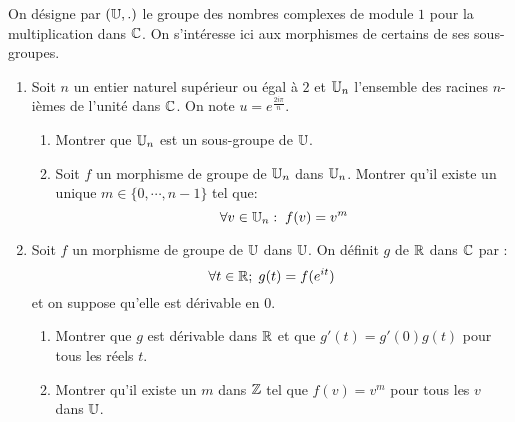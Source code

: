 On désigne par $(\mathbb{U},.)$ le groupe des nombres complexes de module $1$ pour la multiplication dans $\mathbb{C}$. On s'intéresse ici aux morphismes de certains de ses sous-groupes.
\begin{enumerate}
 \item Soit $n$ un entier naturel supérieur ou égal à $2$ et $\mathbb{U}_n$ l'ensemble des racines $n$-ièmes de l'unité dans $\mathbb{C}$. On note $u=e^{\frac{2i\pi}{n}}$.
 \begin{enumerate}
  \item Montrer que $\mathbb{U}_n$ est un sous-groupe de $\mathbb{U}$.
  \item Soit $f$ un morphisme de groupe de $\mathbb{U}_n$ dans $\mathbb{U}_n$. Montrer qu'il existe un unique $m\in\{0,\cdots,n-1\}$ tel que:
\begin{displaymath}
 \forall v\in \mathbb{U}_n :\; f(v)=v^m
\end{displaymath}
 \end{enumerate}

\item Soit $f$ un morphisme de groupe de $\mathbb{U}$ dans $\mathbb{U}$. On définit $g$ de $\mathbb{R}$ dans $\mathbb{C}$ par :
\begin{displaymath}
 \forall t\in \mathbb{R};\; g(t) = f(e^{it})
\end{displaymath}
et on suppose qu'elle est dérivable en $0$.
\begin{enumerate}
 \item Montrer que $g$ est dérivable dans $\mathbb{R}$ et que $g'(t)=g'(0)g(t)$ pour tous les réels $t$.
 \item Montrer qu'il existe un $m$ dans $\mathbb{Z}$ tel que $f(v)=v^m$ pour tous les $v$ dans $\mathbb{U}$.
\end{enumerate}

\end{enumerate}
